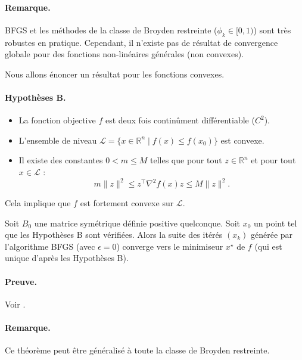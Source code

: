 \paragraph{Remarque.}
BFGS et les méthodes de la classe de Broyden restreinte ($\phi_k \in [0, 1)$) sont très robustes en pratique.
Cependant, il n'existe pas de résultat de convergence globale pour des fonctions non-linéaires générales (non convexes).

Nous allons énoncer un résultat pour les fonctions convexes.

\paragraph{Hypothèses B.}
\begin{itemize}
    \item La fonction objective $f$ est deux fois continûment différentiable ($C^2$).
    \item L'ensemble de niveau $\mathcal{L} = \{ x \in \mathbb{R}^n \mid f(x) \le f(x_0) \}$ est convexe.
    \item Il existe des constantes $0 < m \le M$ telles que pour tout $z \in \mathbb{R}^n$ et pour tout $x \in \mathcal{L}$ :
    \begin{equation}
        m \|z\|^2 \le z^\top \nabla^2 f(x) z \le M \|z\|^2.
    \end{equation}
\end{itemize}
Cela implique que $f$ est fortement convexe sur $\mathcal{L}$.

\begin{theoreme}
    Soit $B_0$ une matrice symétrique définie positive quelconque.
    Soit $x_0$ un point tel que les Hypothèses B sont vérifiées.
    Alors la suite des itérés $(x_k)$ générée par l'algorithme BFGS (avec $\epsilon = 0$) converge vers le minimiseur $x^\star$ de $f$ (qui est unique d'après les Hypothèses B).
\end{theoreme}

\paragraph{Preuve.} Voir \textit{\cite{nocedal2006numerical}}.

\paragraph{Remarque.}
Ce théorème peut être généralisé à toute la classe de Broyden restreinte.

